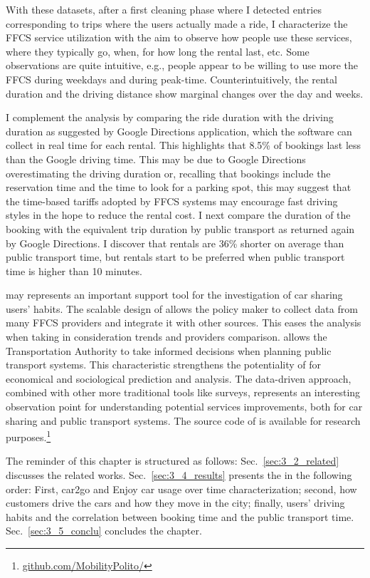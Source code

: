 With these datasets, after a first cleaning phase where I detected entries corresponding to trips where the users actually made a ride, I characterize the FFCS service utilization with the aim to observe how people use these services, where they typically go, when, for how long the rental last, etc. Some observations are quite intuitive, e.g., people appear to be willing to use more the FFCS during weekdays and during peak-time. Counterintuitively, the rental duration and the driving distance show marginal changes over the day and weeks.

I complement the analysis by comparing the ride duration with the driving duration as suggested by Google Directions application, which the software can collect in real time for each rental. This highlights that 8.5\% of bookings last less than the Google driving time. 
This may be due to Google Directions overestimating the driving duration or, recalling that bookings  include the reservation time and the time to look for a parking spot, this may suggest that the time-based tariffs adopted by FFCS systems may encourage fast driving styles in the hope to reduce the rental cost.
I next compare the duration of the booking with the equivalent trip duration by public transport as returned again by Google Directions. I discover that rentals are 36\% shorter on average than public transport time, but  rentals start to be preferred when public transport time is higher than 10 minutes.

\tool may represents an important support tool for the investigation of car sharing users' habits. The scalable design of \tool allows the policy maker to collect data from many FFCS providers  and integrate it with other sources. This eases the analysis when taking in consideration trends and providers comparison. \tool allows the Transportation Authority to take informed decisions when planning public transport systems. This characteristic strengthens the potentiality of \tool for economical and sociological prediction and analysis. The data-driven approach, combined with other more traditional tools like surveys, represents an interesting observation point for understanding potential services improvements, both for car sharing and public transport systems. The source code of \tool  is available for research purposes.\footnote{\url{github.com/MobilityPolito/}}

The reminder of this chapter is structured as follows: Sec.~\ref{sec:3_2_related} discusses the related works. Sec.~\ref{sec:3_4_results} presents the in the following order: First, car2go and Enjoy car usage over time characterization; second, how customers drive the cars and how they move in the city; finally, users' driving habits and the correlation between booking time and the public transport time. Sec.~\ref{sec:3_5_conclu} concludes the chapter.

